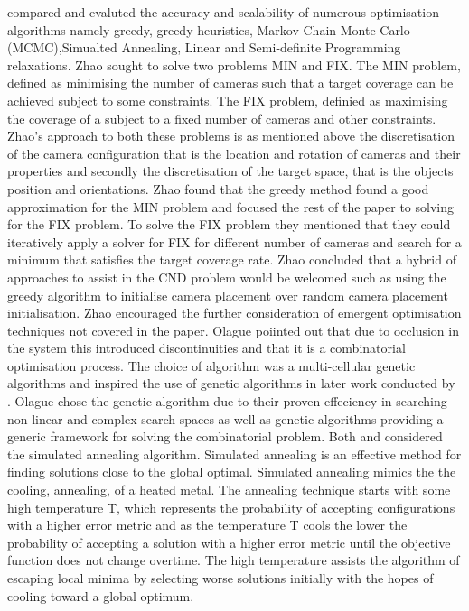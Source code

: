 \citet{zhao2013approximate} compared and evaluted the accuracy and scalability of numerous optimisation algorithms namely greedy, greedy heuristics, Markov-Chain Monte-Carlo (MCMC),Simualted Annealing, Linear and Semi-definite Programming relaxations. Zhao sought to solve two problems MIN and FIX.
The MIN problem, defined as minimising the number of cameras such that a target coverage can be achieved subject to some constraints.
The FIX problem, definied as maximising the coverage of a subject to a fixed number of cameras and other constraints. 
Zhao's approach to both these problems is as mentioned above the discretisation of the camera configuration that is the location and rotation of cameras and their properties and secondly the discretisation of the target space, that is the objects position and orientations.
Zhao found that the greedy method found a good approximation for the MIN problem and focused the rest of the paper to solving for the FIX problem. To solve the FIX problem they mentioned that they could iteratively apply a solver for FIX for different number of cameras and search for a minimum that satisfies the target coverage rate. 
Zhao concluded that a hybrid of approaches to assist in the CND problem would be welcomed such as using the greedy algorithm to initialise camera placement over random camera placement initialisation. Zhao encouraged the further consideration of emergent optimisation techniques not covered in the paper. 
Olague poiinted out that due to occlusion in the system this introduced discontinuities and that it is a combinatorial optimisation process. The choice of algorithm was a multi-cellular genetic algorithms and inspired the use of genetic algorithms in later work conducted by \citet{aissaoui2018designing}. Olague chose the genetic algorithm due to their proven effeciency in searching non-linear and complex search spaces as well as genetic algorithms providing a generic framework for solving the combinatorial problem.
Both \citet{zhao2013approximate} and \citet{rahimian2016optimal} considered the simulated annealing algorithm. Simulated annealing is an effective method for finding solutions close to the global optimal. Simulated annealing mimics the the cooling, annealing, of a heated metal. The annealing technique starts with some high temperature T, which represents the probability of accepting configurations with a higher error metric and as the temperature T cools the lower the probability of accepting a solution with a higher error metric until the objective function does not change overtime. The high temperature assists the algorithm of escaping local minima by selecting worse solutions initially with the hopes of cooling toward a global optimum.

